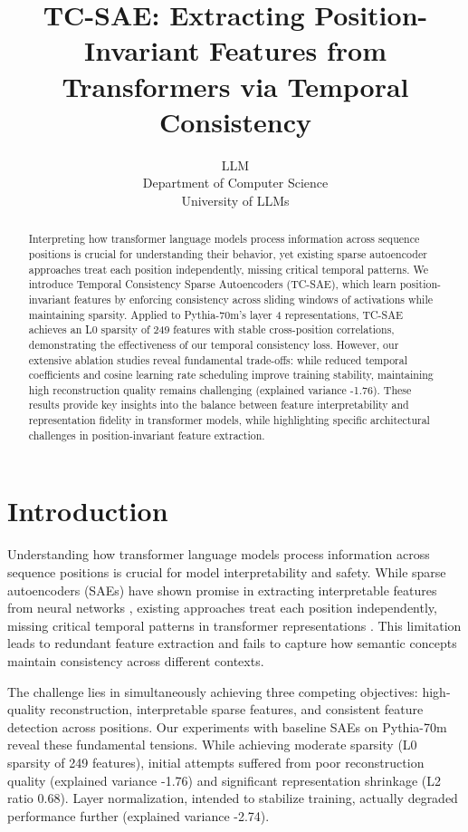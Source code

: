 \documentclass{article} %
\title{TC-SAE: Extracting Position-Invariant Features from Transformers via Temporal Consistency}
\author{LLM\\
Department of Computer Science\\
University of LLMs\\
}
\begin{document}
\maketitle

\begin{abstract}
Interpreting how transformer language models process information across sequence positions is crucial for understanding their behavior, yet existing sparse autoencoder approaches treat each position independently, missing critical temporal patterns. We introduce Temporal Consistency Sparse Autoencoders (TC-SAE), which learn position-invariant features by enforcing consistency across sliding windows of activations while maintaining sparsity. Applied to Pythia-70m's layer 4 representations, TC-SAE achieves an L0 sparsity of 249 features with stable cross-position correlations, demonstrating the effectiveness of our temporal consistency loss. However, our extensive ablation studies reveal fundamental trade-offs: while reduced temporal coefficients and cosine learning rate scheduling improve training stability, maintaining high reconstruction quality remains challenging (explained variance -1.76). These results provide key insights into the balance between feature interpretability and representation fidelity in transformer models, while highlighting specific architectural challenges in position-invariant feature extraction.
\end{abstract}

\section{Introduction}
\label{sec:intro}

Understanding how transformer language models process information across sequence positions is crucial for model interpretability and safety. While sparse autoencoders (SAEs) have shown promise in extracting interpretable features from neural networks \cite{goodfellow2016deep}, existing approaches treat each position independently, missing critical temporal patterns in transformer representations \cite{vaswani2017attention}. This limitation leads to redundant feature extraction and fails to capture how semantic concepts maintain consistency across different contexts.

The challenge lies in simultaneously achieving three competing objectives: high-quality reconstruction, interpretable sparse features, and consistent feature detection across positions. Our experiments with baseline SAEs on Pythia-70m reveal these fundamental tensions. While achieving moderate sparsity (L0 sparsity of 249 features), initial attempts suffered from poor reconstruction quality (explained variance -1.76) and significant representation shrinkage (L2 ratio 0.68). Layer normalization, intended to stabilize training, actually degraded performance further (explained variance -2.74).
\end{document}
